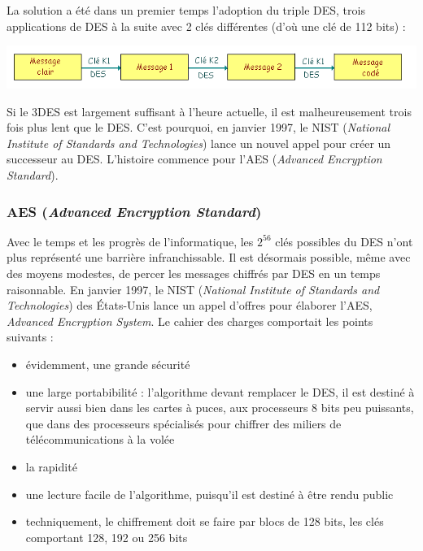 \documentclass[a4paper,12pt]{article}
\begin{document}
La solution a été dans un premier temps l'adoption du triple DES, trois applications de DES à la suite avec 2 clés différentes (d'où une clé de 112 bits) :

\begin{center}
  \includegraphics[width=\textwidth]{../Image/3des.png}
\end{center}

Si le 3DES est largement suffisant à l'heure actuelle, il est malheureusement trois fois plus lent que le DES. C'est pourquoi, en janvier 1997, le NIST (\emph{National Institute of Standards and Technologies}) lance un nouvel appel pour créer un successeur au DES. L'histoire commence pour l'AES (\emph{Advanced Encryption Standard}).

\subsubsection{AES (\emph{Advanced Encryption Standard})}

Avec le temps et les progrès de l'informatique, les $2^{56}$ clés possibles du DES n'ont plus représenté une barrière infranchissable. Il est désormais possible, même avec des moyens modestes, de percer les messages chiffrés par DES en un temps raisonnable. En janvier 1997, le NIST (\emph{National Institute of Standards and Technologies}) des \'{E}tats-Unis lance un appel d'offres pour élaborer l'AES, \emph{Advanced Encryption System}. Le cahier des charges comportait les points suivants :

\begin{itemize}
\item évidemment, une grande sécurité
\item une large portabibilité : l'algorithme devant remplacer le DES, il est destiné à servir aussi bien dans les cartes à puces, aux processeurs 8 bits peu puissants, que dans des processeurs spécialisés pour chiffrer des miliers de télécommunications à la volée
\item la rapidité
\item une lecture facile de l'algorithme, puisqu'il est destiné à être rendu public
\item techniquement, le chiffrement doit se faire par blocs de 128 bits, les clés comportant 128, 192 ou 256 bits
\end{itemize}
\end{document}
